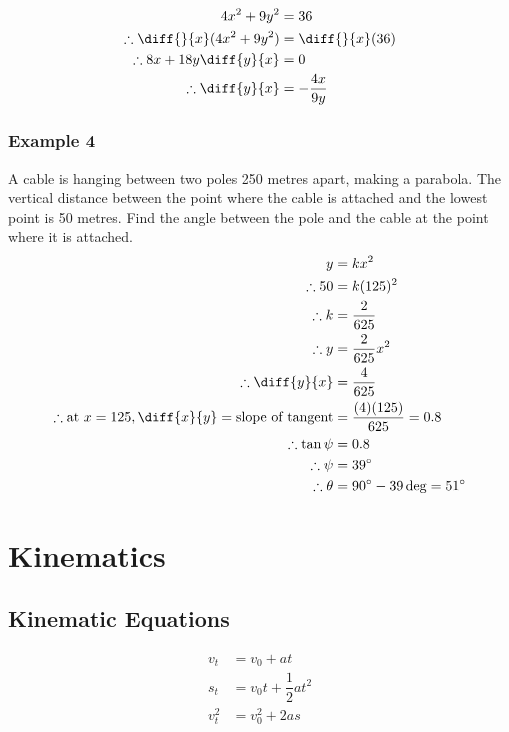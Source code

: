\documentclass[fleqn]{article}
\begin{document}
\begin{align*}
	4x^2 + 9y^2 &= 36\\
	\therefore \diff{}{x}(4x^2 + 9y^2) &= \diff{}{x} (36)\\
	\therefore 8x + 18y \diff{y}{x} &= 0\\
	\therefore \diff{y}{x} &= - \dfrac{4x}{9y}
\end{align*}

\subsubsection{Example 4}

A cable is hanging between two poles 250 metres apart, making a parabola. The vertical distance between the point where the cable is attached and the lowest point is 50 metres. Find the angle between the pole and the cable at the point where it is attached.\\

\begin{align*}
	y &= kx^2\\
	\therefore 50 &= k(125)^2\\	
	\therefore k &= \dfrac{2}{625}\\
	\therefore y &=\dfrac{2}{625} x^2\\
	\therefore \diff{y}{x} &= \dfrac{4}{625}\\
	\therefore \text{at } x = 125, \diff{x}{y} = \text{slope of tangent} &= \dfrac{(4)(125)}{625} = 0.8 \\
	\therefore \tan \psi &= 0.8\\
	\therefore \psi &= 39\degree\\
	\therefore \theta &= 90\degree - 39\deg = 51\degree
\end{align*}

\newpage
\section{Kinematics}

\subsection{Kinematic Equations}

\begin{align}	
	v_t &= v_0 + a t \\
	s_t &= v_0 t + \dfrac{1}{2} a t^2 \\
	v_t^2 &= v_0^2 + 2 a s 
\end{align}
\end{document}
